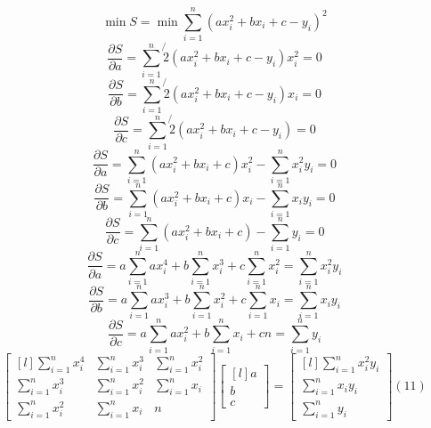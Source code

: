 \documentclass[21pt,a4paper,twoside]{article}
\begin{document}
\Large
\begin{equation}
	\min S = \min \sum_{i = 1}^{n} (ax_i^2 + bx_i + c - y_i)^2
\end{equation}
	\newline
	\begin{equation}
		\frac{\partial S}{\partial a} = \sum_{i=1}^{n} \not{2} (ax_i^2 + bx_i + c - y_i) x_i^2 = 0
	\end{equation}
	\begin{equation}
		\frac{\partial S}{\partial b} = \sum_{i=1}^{n} \not{2} (ax_i^2 + bx_i + c - y_i) x_i = 0
	\end{equation}
	\begin{equation}
		\frac{\partial S}{\partial c} = \sum_{i=1}^{n} \not{2} (ax_i^2 + bx_i + c - y_i) = 0
	\end{equation}
	\newline
	\begin{equation}
		\frac{\partial S}{\partial a} = \sum_{i=1}^{n} (ax_i^2 + bx_i + c) x_i^2 - \sum_{i=1}^{n} x_i^2 y_i = 0
	\end{equation}
	\begin{equation}
		\frac{\partial S}{\partial b} = \sum_{i=1}^{n} (ax_i^2 + bx_i + c) x_i - \sum_{i=1}^{n} x_i y_i = 0
	\end{equation}
	\begin{equation}
		\frac{\partial S}{\partial c} = \sum_{i=1}^{n} (ax_i^2 + bx_i + c) - \sum_{i=1}^{n} y_i = 0
	\end{equation}
	\newline
	\begin{equation}
		\frac{\partial S}{\partial a} = a\sum_{i=1}^{n} ax_i^4 + b\sum_{i=1}^{n} x_i^3 + c\sum_{i=1}^{n} x_i^2 = \sum_{i=1}^{n} x_i^2 y_i
	\end{equation}
	\begin{equation}
		\frac{\partial S}{\partial b} = a\sum_{i=1}^{n} ax_i^3 + b\sum_{i=1}^{n} x_i^2 + c\sum_{i=1}^{n} x_i = \sum_{i=1}^{n} x_i y_i
	\end{equation}
	\begin{equation}
		\frac{\partial S}{\partial c} = a\sum_{i=1}^{n} ax_i^2 + b\sum_{i=1}^{n} x_i + cn = \sum_{i=1}^{n} y_i
	\end{equation}
	\newline
	\[    %
	\begin{bmatrix*}[l]
		\sum_{i=1}^{n} x_i^4 & \sum_{i=1}^{n} x_i^3 & \sum_{i=1}^{n} x_i^2 \\
		\sum_{i=1}^{n} x_i^3 & \sum_{i=1}^{n} x_i^2 & \sum_{i=1}^{n} x_i \\
		\sum_{i=1}^{n} x_i^2 & \sum_{i=1}^{n} x_i & n
	\end{bmatrix*}
	\begin{bmatrix*}[l]
		a \\
		b \\
		c
	\end{bmatrix*}
	=
	\begin{bmatrix*}[l]
		\sum_{i=1}^{n} x_i^2 y_i \\
		\sum_{i=1}^{n} x_i y_i \\
		\sum_{i=1}^{n} y_i
	\end{bmatrix*}
	(11)
	\] 
\end{document}

